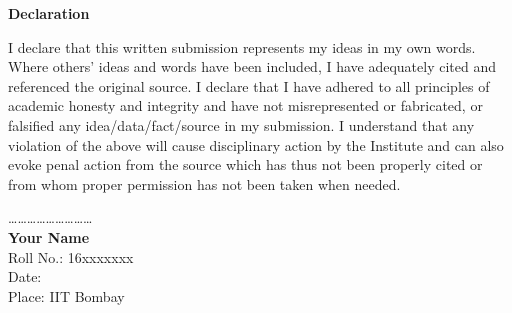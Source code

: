 \documentclass[12pt, a4paper, twoside, openright]{Thesis} %
\newcommand\myemptypage{
    \null
    \thispagestyle{empty}
    \addtocounter{page}{-1}
    \newpage
    }
\begin{document}
{\clearpage %

\myemptypage



{ %

\centerline{\textbf{\LARGE {Declaration}}}}
\vspace{3em}
I declare that this written submission represents my ideas in my own words. Where others' ideas and words have been included, I have adequately cited and referenced the original source. I declare that I have adhered to all principles of academic honesty and integrity and have not misrepresented or fabricated, or falsified any idea/data/fact/source in my submission. I understand that any violation of the above will cause disciplinary action by the Institute and can also evoke penal action from the source which has thus not been properly cited or from whom proper permission has not been taken when needed.

\bigskip
\bigskip
\bigskip
\bigskip

\begin{flushleft}
\ldots \ldots \ldots \ldots \ldots \ldots \ldots \ldots \ldots\\
\vspace{2mm}
\textbf{Your Name} \\
Roll No.: 16xxxxxxx \\
Date:  \\
Place: IIT Bombay
\end{flushleft}

\clearpage %
\myemptypage






}
\end{document}
